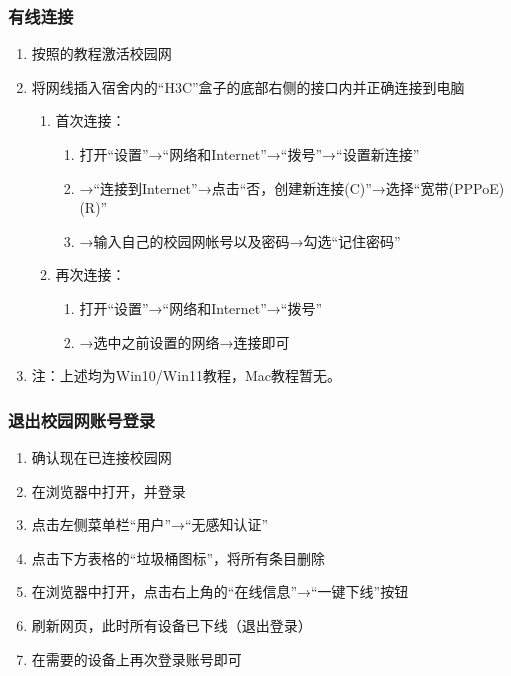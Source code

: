 \subsubsection[有线连接]{有线连接}
\begin{enumerate}
    \item 按照的教程激活校园网
    \item 将网线插入宿舍内的“H3C”盒子的底部右侧的接口内并正确连接到电脑\footnotemark
          \begin{enumerate}
              \item 首次连接：
                    \begin{enumerate}
                        \item 打开“设置”→“网络和Internet”→“拨号”→“设置新连接”
                        \item →“连接到Internet”→点击“否，创建新连接(C)”→选择“宽带(PPPoE)(R)”
                        \item →输入自己的校园网帐号以及密码→勾选“记住密码”
                    \end{enumerate}
              \item 再次连接：
                    \begin{enumerate}
                        \item 打开“设置”→“网络和Internet”→“拨号”
                        \item →选中之前设置的网络→连接即可
                    \end{enumerate}
          \end{enumerate}
    \item  注：上述均为Win10/Win11教程，Mac教程暂无。
\end{enumerate}

\subsubsection[退出校园网账号登录]{退出校园网账号登录}
\begin{enumerate}
    \item 确认现在已连接校园网
    \item 在浏览器中打开，并登录
    \item 点击左侧菜单栏“用户”→“无感知认证”
    \item 点击下方表格的“垃圾桶图标”，将所有条目删除
    \item 在浏览器中打开，点击右上角的“在线信息”→“一键下线”按钮
    \item 刷新网页，此时所有设备已下线（退出登录）
    \item 在需要的设备上再次登录账号即可
\end{enumerate}

